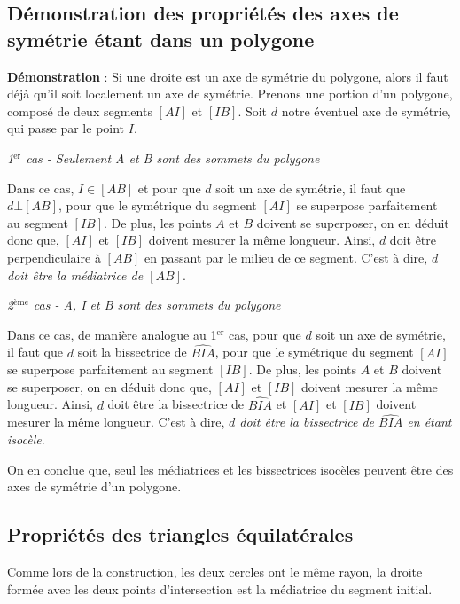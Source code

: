 \documentclass[a4paper, twoside]{article}
\begin{document}
\subsection*{Démonstration des propriétés des axes de symétrie étant dans un polygone} \label{demo_axes_symétrie_polygone}

\textbf{Démonstration} : Si une droite est un axe de symétrie du polygone,
alors il faut déjà qu'il soit localement un axe de symétrie.
Prenons une portion d'un polygone, composé de deux segments $[AI]$ et $[IB]$.
Soit $d$ notre éventuel axe de symétrie, qui passe par le point $I$.

\smallbreak

\textit{1$^{\text{er}}$ cas - Seulement A et B sont des sommets du polygone}

Dans ce cas, $I \in [AB]$ et pour que $d$ soit un axe de symétrie,
il faut que $d\bot[AB]$, pour que le symétrique du segment $[AI]$ se
superpose parfaitement au segment $[IB]$.
De plus, les points $A$ et $B$ doivent se superposer,
on en déduit donc que,
$[AI]$ et $[IB]$ doivent mesurer la même longueur.
Ainsi, $d$ doit être perpendiculaire à $[AB]$ en passant par le milieu de ce segment.
C'est à dire, \emph{$d$ doit être la médiatrice de $[AB]$}.

\smallbreak

\textit{2$^{\text{ème}}$ cas - A, I et B sont des sommets du polygone}

Dans ce cas, de manière analogue au 1$^{\text{er}}$ cas,
pour que $d$ soit un axe de symétrie,
il faut que $d$ soit la bissectrice de $\widehat{BIA}$,
pour que le symétrique du segment $[AI]$ se
superpose parfaitement au segment $[IB]$.
De plus, les points $A$ et $B$ doivent se superposer,
on en déduit donc que,
$[AI]$ et $[IB]$ doivent mesurer la même longueur.
Ainsi, $d$ doit être la bissectrice de $\widehat{BIA}$ et $[AI]$ et $[IB]$ doivent mesurer la même longueur.
C'est à dire, \emph{$d$ doit être la bissectrice de $\widehat{BIA}$ en étant isocèle}.

On en conclue que, seul les médiatrices et les bissectrices isocèles peuvent être des
axes de symétrie d'un polygone.

\subsection*{Propriétés des triangles équilatérales} \label{propriete_triangle_equilateral}

Comme lors de la construction,
les deux cercles ont le même rayon,
la droite formée avec les deux points d'intersection est la médiatrice du segment initial.
\end{document}

